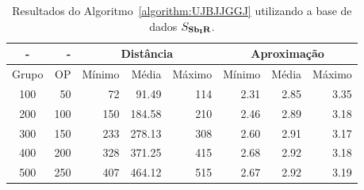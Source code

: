 \begin{table}[!htb]
  \caption{Resultados do Algoritmo~\ref{algorithm:UJBJJGGJ} utilizando a base de dados $S_{\textbf{Sb\textsubscript{I}R}}{}$.}
  \label{table:PPPESHDE}
  \centering
  \begin{tabular}{|c|r|r|r|r|r|r|r|}
    \hline
      -      &  -   & \multicolumn{3}{c|}{Distância}             & \multicolumn{3}{c|}{Aproximação}           \\ \hline
    Grupo    & OP   & Mínimo       & Média        & Máximo       & Mínimo       & Média        & Máximo       \\ \hline  
    100      & 50   & 72           &  91.49       & 114          & 2.31         & 2.85         & 3.35         \\ \hline
    200      & 100  & 150          & 184.58       & 210          & 2.46         & 2.89         & 3.18         \\ \hline
    300      & 150  & 233          & 278.13       & 308          & 2.60         & 2.91         & 3.17         \\ \hline
    400      & 200  & 328          & 371.25       & 415          & 2.68         & 2.92         & 3.18         \\ \hline
    500      & 250  & 407          & 464.12       & 515          & 2.67         & 2.92         & 3.19         \\ \hline    
  \end{tabular}
\end{table}